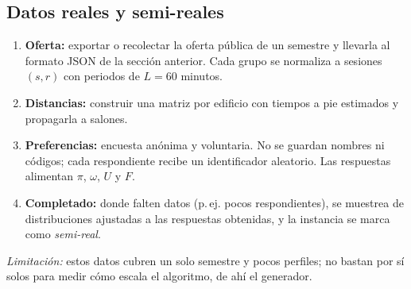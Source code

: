\documentclass[11pt,letterpaper]{article}
\theoremstyle{definition}
\theoremstyle{remark}
\theoremstyle{plain}
\begin{document}
\subsection{Datos reales y semi-reales}
\begin{enumerate}[nosep]
  \item \textbf{Oferta:} exportar o recolectar la oferta pública de un
        semestre y llevarla al formato JSON de la sección anterior. Cada
        grupo se normaliza a sesiones $(s,r)$ con periodos de $L=60$ minutos.
  \item \textbf{Distancias:} construir una matriz por edificio con
        tiempos a pie estimados y propagarla a salones.
  \item \textbf{Preferencias:} encuesta anónima y voluntaria. No se guardan
        nombres ni códigos; cada respondiente recibe un identificador
        aleatorio. Las respuestas alimentan $\pi$, $\omega$, $U$ y $F$.
  \item \textbf{Completado:} donde falten datos (p.\,ej. pocos
        respondientes), se muestrea de distribuciones ajustadas a las
        respuestas obtenidas, y la instancia se marca como
        \emph{semi-real}.
\end{enumerate}
\emph{Limitación:} estos datos cubren un solo semestre y pocos perfiles; no
bastan por sí solos para medir cómo escala el algoritmo, de ahí el generador.
\end{document}
